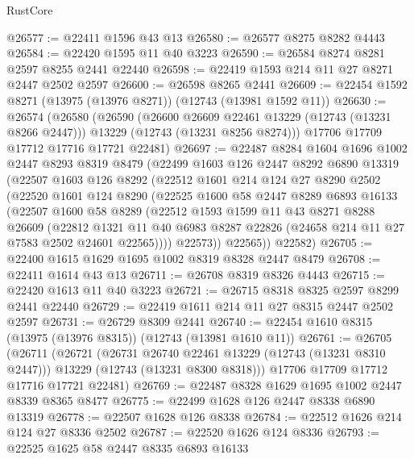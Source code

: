 \begin{lexlean}{RustCore}
\begin{coremodule}
@26577 := @22411 @1596 @43 @13
@26580 := @26577 @8275 @8282 @4443
@26584 := @22420 @1595 @11 @40 @3223
@26590 := @26584 @8274 @8281 @2597 @8255 @2441 @22440
@26598 := @22419 @1593 @214 @11 @27 @8271 @2447 @2502 @2597
@26600 := @26598 @8265 @2441
@26609 := @22454 @1592 @8271 (@13975 (@13976 @8271)) (@12743 (@13981 @1592 @11))
@26630 := @26574
    (@26580
      (@26590
        (@26600 @26609 @22461 @13229 (@12743 (@13231 @8266 @2447)))
        @13229
        (@12743 (@13231 @8256 @8274)))
      @17706
      @17709
      @17712
      @17716
      @17721
      @22481)
@26697 := @22487
    @8284
    @1604
    @1696
    @1002
    @2447
    @8293
    @8319
    @8479
    (@22499
      @1603
      @126
      @2447
      @8292
      @6890
      @13319
      (@22507
        @1603
        @126
        @8292
        (@22512
          @1601
          @214
          @124
          @27
          @8290
          @2502
          (@22520
            @1601
            @124
            @8290
            (@22525
              @1600
              @58
              @2447
              @8289
              @6893
              @16133
              (@22507
                @1600
                @58
                @8289
                (@22512
                  @1593
                  @1599
                  @11
                  @43
                  @8271
                  @8288
                  @26609
                  (@22812
                    @1321
                    @11
                    @40
                    @6983
                    @8287
                    @22826
                    (@24658 @214 @11 @27 @7583 @2502 @24601 @22565))))
              @22573))
          @22565))
      @22582)
@26705 := @22400 @1615 @1629 @1695 @1002 @8319 @8328 @2447 @8479
@26708 := @22411 @1614 @43 @13
@26711 := @26708 @8319 @8326 @4443
@26715 := @22420 @1613 @11 @40 @3223
@26721 := @26715 @8318 @8325 @2597 @8299 @2441 @22440
@26729 := @22419 @1611 @214 @11 @27 @8315 @2447 @2502 @2597
@26731 := @26729 @8309 @2441
@26740 := @22454 @1610 @8315 (@13975 (@13976 @8315)) (@12743 (@13981 @1610 @11))
@26761 := @26705
    (@26711
      (@26721
        (@26731 @26740 @22461 @13229 (@12743 (@13231 @8310 @2447)))
        @13229
        (@12743 (@13231 @8300 @8318)))
      @17706
      @17709
      @17712
      @17716
      @17721
      @22481)
@26769 := @22487 @8328 @1629 @1695 @1002 @2447 @8339 @8365 @8477
@26775 := @22499 @1628 @126 @2447 @8338 @6890 @13319
@26778 := @22507 @1628 @126 @8338
@26784 := @22512 @1626 @214 @124 @27 @8336 @2502
@26787 := @22520 @1626 @124 @8336
@26793 := @22525 @1625 @58 @2447 @8335 @6893 @16133

\end{coremodule}
\end{lexlean}
